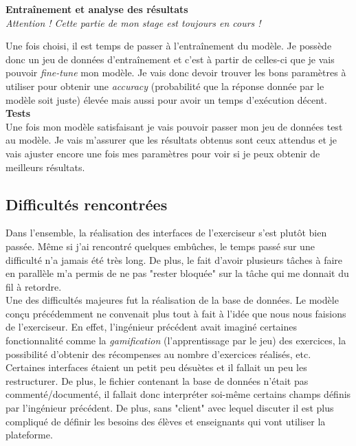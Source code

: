 \documentclass[12pt]{article}
\begin{document}
 \clearpage

\textbf{Entraînement et analyse des résultats} \\
\textit{Attention ! Cette partie de mon stage est toujours en cours !}

Une fois choisi, il est temps de passer à l'entraînement du modèle. Je possède donc un jeu de données d'entraînement et c'est à partir de celles-ci que je vais pouvoir \textit{fine-tune} mon modèle. Je vais donc devoir trouver les bons paramètres à utiliser pour obtenir une \textit{accuracy} (probabilité que la réponse donnée par le modèle soit juste) élevée mais aussi pour avoir un temps d'exécution décent. \\ 

\textbf{Tests} \\
Une fois mon modèle satisfaisant je vais pouvoir passer mon jeu de données test au modèle. Je vais m'assurer que les résultats obtenus sont ceux attendus et je vais ajuster encore une fois mes paramètres pour voir si je peux obtenir de meilleurs résultats.  


\subsection{Difficultés rencontrées}

Dans l’ensemble, la réalisation des interfaces de l’exerciseur s’est plutôt bien passée. Même si j’ai rencontré quelques embûches, le temps passé sur une difficulté n’a jamais été très long. De plus, le fait d’avoir plusieurs tâches à faire en parallèle m’a permis de ne pas "rester bloquée" sur la tâche qui me donnait du fil à retordre. \\

Une des difficultés majeures fut la réalisation de la base de données. Le modèle conçu précédemment ne convenait plus tout à fait à l'idée que nous nous faisions de l’exerciseur. En effet, l'ingénieur précédent avait imaginé certaines fonctionnalité comme la \textit{gamification} (l'apprentissage par le jeu) des exercices, la possibilité d'obtenir des récompenses au nombre d'exercices réalisés, etc. Certaines interfaces étaient un petit peu désuètes et il fallait un peu les restructurer.   
De plus, le fichier contenant la base de données n’était pas commenté/documenté, il fallait donc interpréter soi-même certains champs définis par l’ingénieur précédent.  De plus, sans "client" avec lequel discuter il est plus compliqué de définir les besoins des élèves et enseignants qui vont utiliser la plateforme. \\
\end{document}
